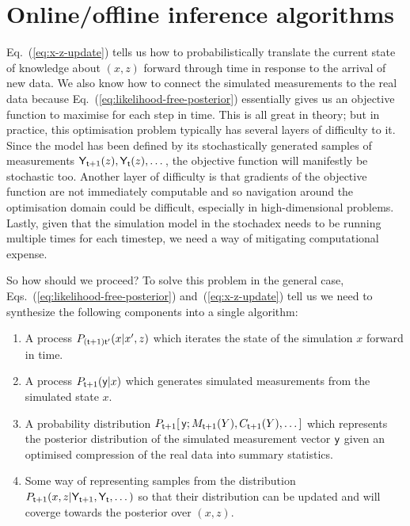 \section{\sffamily Online/offline inference algorithms}

Eq.~(\ref{eq:x-z-update}) tells us how to probabilistically translate the current state of knowledge about $(x,z)$ forward through time in response to the arrival of new data. We also know how to connect the simulated measurements to the real data because Eq.~(\ref{eq:likelihood-free-posterior}) essentially gives us an objective function to maximise for each step in time. This is all great in theory; but in practice, this optimisation problem typically has several layers of difficulty to it. Since the model has been defined by its stochastically generated samples of measurements ${\sf Y}_{{\sf t}+1}(z), {\sf Y}_{{\sf t}}(z), \dots$, the objective function will manifestly be stochastic too. Another layer of difficulty is that gradients of the objective function are not immediately computable and so navigation around the optimisation domain could be difficult, especially in high-dimensional problems. Lastly, given that the simulation model in the stochadex needs to be running multiple times for each timestep, we need a way of mitigating computational expense. 

So how should we proceed? To solve this problem in the general case, Eqs.~(\ref{eq:likelihood-free-posterior}) and~(\ref{eq:x-z-update}) tell us we need to synthesize the following components into a single algorithm:
\begin{enumerate}
\item{A process $P_{({\sf t}+1){\sf t}'}(x\vert x', z)$ which iterates the state of the simulation $x$ forward in time.}
\item{A process $P_{{\sf t}+1}({\sf y}\vert x)$ which generates simulated measurements from the simulated state $x$.}
\item{A probability distribution $P_{{\sf t}+1}[\,{\sf y};M_{{\sf t}+1}(Y),C_{{\sf t}+1}(Y), \dots ]$ which represents the posterior distribution of the simulated measurement vector ${\sf y}$ given an optimised compression of the real data into summary statistics.}
\item{Some way of representing samples from the distribution $P_{{\sf t}+1}(x,z\vert {\sf Y}_{{\sf t}+1}, {\sf Y}_{{\sf t}}, \dots )$ so that their distribution can be updated and will coverge towards the posterior over $(x,z)$.}
\end{enumerate}


